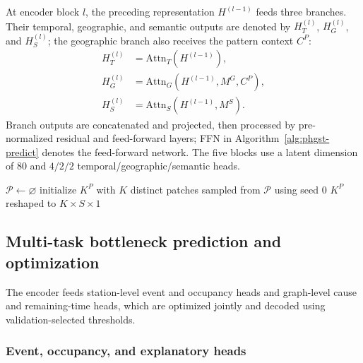 \documentclass[a4paper,fleqn]{cas-dc}
\begin{document}
At encoder block $l$, the preceding representation $H^{(l-1)}$ feeds three branches. Their temporal, geographic, and semantic outputs are denoted by $H_T^{(l)}$, $H_G^{(l)}$, and $H_S^{(l)}$; the geographic branch also receives the pattern context $C^P$:
\begin{equation}
\begin{aligned}
H_T^{(l)}&=\mathrm{Attn}_T(H^{(l-1)}),\\
H_G^{(l)}&=\mathrm{Attn}_G(H^{(l-1)},M^G,C^P),\\
H_S^{(l)}&=\mathrm{Attn}_S(H^{(l-1)},M^S).
\end{aligned}
\end{equation}
Branch outputs are concatenated and projected, then processed by pre-normalized residual and feed-forward layers; FFN in Algorithm~\ref{alg:phgst-predict} denotes the feed-forward network. The five blocks use a latent dimension of 80 and $4/2/2$ temporal/geographic/semantic heads.

\begin{algorithm}[t]
\caption{Training-only temporal pattern clustering.}
\label{alg:pattern-bank}
$\mathcal{P}\leftarrow\varnothing$\;
initialize $K^P$ with $K$ distinct patches sampled from $\mathcal{P}$ using seed $0$\;
\Return $K^P$ reshaped to $K\times S\times1$\;
\end{algorithm}

\subsection{Multi-task bottleneck prediction and optimization}

The encoder feeds station-level event and occupancy heads and graph-level cause and remaining-time heads, which are optimized jointly and decoded using validation-selected thresholds.

\subsubsection{Event, occupancy, and explanatory heads}
\end{document}
